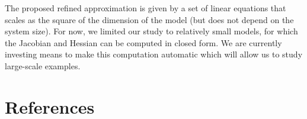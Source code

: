 \documentclass[review]{elsarticle}
\begin{document}
The proposed refined approximation is given by a set of linear
equations that scales as the square of the dimension of the model (but
does not depend on the system size). For now, we limited our study to
relatively small models, for which the Jacobian and Hessian can be
computed in closed form. We are currently investing means to make this
computation automatic which will allow us to study large-scale
examples. 

\section*{References}

\end{document}
